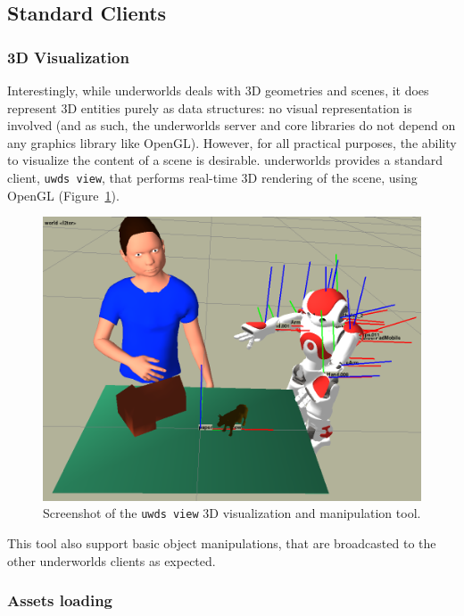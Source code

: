 \documentclass[letterpaper, 10 pt, conference]{ieeeconf}  %
\newcommand{\uwds}{{\sc underworlds}\xspace}
\begin{document}
\subsection{Standard Clients}
\label{std_clients}

\subsubsection{3D Visualization}

Interestingly, while \uwds deals with 3D geometries and scenes, it does
represent 3D entities purely as data structures: no visual representation is
involved (and as such, the \uwds server and core libraries do not depend on any
graphics library like OpenGL). However, for all practical purposes, the ability
to visualize the content of a scene is desirable. \uwds provides a standard
client, {\tt uwds view}, that performs real-time 3D rendering of the scene,
using OpenGL (Figure~\ref{fig|uwds-view}).

\begin{figure}
    \centering
    \includegraphics[width=0.9\linewidth]{uwds-screenshot}
    \caption{Screenshot of the {\tt uwds view} 3D visualization and manipulation
    tool.}
    \label{fig|uwds-view}
\end{figure}

This tool also support basic object manipulations, that are broadcasted to the
other \uwds clients as expected.

\subsubsection{Assets loading}
\end{document}
